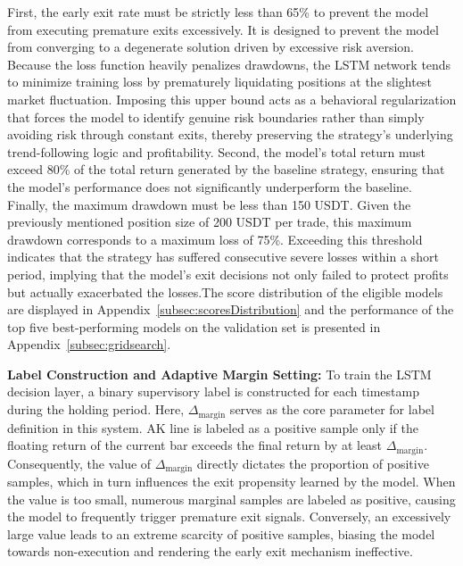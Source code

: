 \documentclass[12pt]{article}
\begin{document}
First, the early exit rate must be strictly less than 65\% to prevent the model from executing premature exits excessively. It is designed to prevent the model from converging to a degenerate solution driven by excessive risk aversion. Because the loss function heavily penalizes drawdowns, the LSTM network tends to minimize training loss by prematurely liquidating positions at the slightest market fluctuation. Imposing this upper bound acts as a behavioral regularization that forces the model to identify genuine risk boundaries rather than simply avoiding risk through constant exits, thereby preserving the strategy's underlying trend-following logic and profitability. Second, the model's total return must exceed 80\% of the total return generated by the baseline strategy, ensuring that the model's performance does not significantly underperform the baseline. Finally, the maximum drawdown must be less than 150 USDT. Given the previously mentioned position size of 200 USDT per trade, this maximum drawdown corresponds to a maximum loss of 75\%. Exceeding this threshold indicates that the strategy has suffered consecutive severe losses within a short period, implying that the model's exit decisions not only failed to protect profits but actually exacerbated the losses.The score distribution of the eligible models are displayed in Appendix~\ref{subsec:scoresDistribution} and the performance of the top five best-performing models on the validation set is presented in Appendix~\ref{subsec:gridsearch}.

\textbf{Label Construction and Adaptive Margin Setting:} To train the LSTM decision layer, a binary supervisory label is constructed for each timestamp during the holding period. Here, $\Delta_{\text{margin}}$ serves as the core parameter for label definition in this system. AK line is labeled as a positive sample only if the floating return of the current bar exceeds the final return by at least $\Delta_{\text{margin}}$. Consequently, the value of $\Delta_{\text{margin}}$ directly dictates the proportion of positive samples, which in turn influences the exit propensity learned by the model. When the value is too small, numerous marginal samples are labeled as positive, causing the model to frequently trigger premature exit signals. Conversely, an excessively large value leads to an extreme scarcity of positive samples, biasing the model towards non-execution and rendering the early exit mechanism ineffective.
\end{document}

